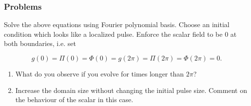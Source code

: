 \subsubsection{Problems}

Solve the above equations using Fourier polynomial basis. Choose an initial condition which looks like a localized pulse. Enforce the scalar field to be 0 at both boundaries, i.e. set

\begin{equation}
    g(0) = \Pi(0) = \Phi(0) = g(2\pi) = \Pi(2\pi) = \Phi(2\pi) = 0.
\end{equation}

\begin{enumerate}
    \item What do you observe if you evolve for times longer than $2\pi$?
    \item Increase the domain size without changing the initial pulse size. Comment on the behaviour of the scalar in this case. 
\end{enumerate}